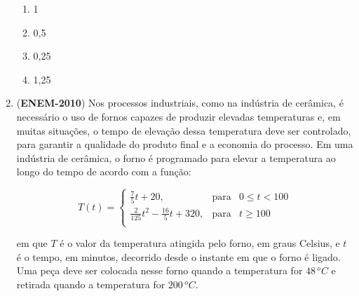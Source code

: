 \begin{enumerate}
\begin{figure}[H]
\end{figure}
\begin{enumerate}
\item 1
\item 0,5
\item 0,25
\item 1,25
\end{enumerate}

\item (\textbf{ENEM-2010}) Nos processos industriais, como na indústria de cerâmica, é necessário o uso de fornos capazes de produzir elevadas temperaturas e, em muitas situações, o tempo de elevação dessa temperatura deve ser controlado, para garantir a qualidade do produto final e a economia do processo.
Em uma indústria de cerâmica, o forno é programado para elevar a temperatura ao longo do tempo de acordo
com a função:

\begin{equation*}
T(t) = \left\{ \begin{array}{rlll}\displaystyle \frac{7}{5}t+20, & \text{para} & 0 \leq t < 100 \\\displaystyle \frac{2}{125}t^2- \frac{16}{5}t +320, & \text{para} & t \geq 100 \\ \end{array} \right.
\end{equation*}

em que \(T\) é o valor da temperatura atingida pelo forno, em graus Celsius, e \(t\) é o tempo, em minutos, decorrido desde o instante em que o forno é ligado.
Uma peça deve ser colocada nesse forno quando a temperatura for \(48 \,^{o}C\) e retirada quando a temperatura for \(200 \,^{o}C\).


\end{enumerate}
